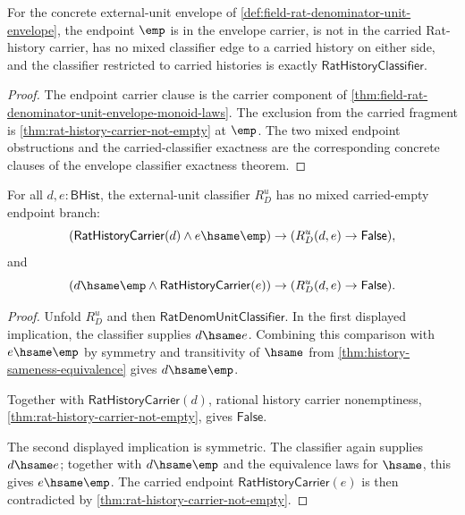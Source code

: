 \begin{theorem}
\label{thm:field-rat-denominator-unit-envelope-external-strict-fragment}
For the concrete external-unit envelope of
\autoref{def:field-rat-denominator-unit-envelope}, the endpoint $\emp$ is in
the envelope carrier, is not in the carried Rat-history carrier, has no mixed
classifier edge to a carried history on either side, and the classifier
restricted to carried histories is exactly $\mathsf{RatHistoryClassifier}$.
\end{theorem}
\begin{proof}
The endpoint carrier clause is the carrier component of
\autoref{thm:field-rat-denominator-unit-envelope-monoid-laws}. The exclusion
from the carried fragment is \autoref{thm:rat-history-carrier-not-empty} at
$\emp$. The two mixed endpoint obstructions and the carried-classifier
exactness are the corresponding concrete clauses of the envelope classifier
exactness theorem.
\end{proof}

\begin{theorem}
\label{thm:field-rat-denominator-unit-envelope-mixed-endpoint-separation}
For all $d,e:\mathsf{BHist}$, the external-unit classifier $R_D^u$ has no
mixed carried-empty endpoint branch:
$$
(\mathsf{RatHistoryCarrier}(d)\land e\hsame\emp)
\to (R_D^u(d,e)\to \mathsf{False}),
$$
and
$$
(d\hsame\emp\land \mathsf{RatHistoryCarrier}(e))
\to (R_D^u(d,e)\to \mathsf{False}).
$$
\end{theorem}
\begin{proof}
Unfold $R_D^u$ and then
$\mathsf{RatDenomUnitClassifier}$. In the first displayed implication, the
classifier supplies $d\hsame e$. Combining this comparison with $e\hsame\emp$
by symmetry and transitivity of $\hsame$ from
\autoref{thm:history-sameness-equivalence} gives $d\hsame\emp$.

Together with $\mathsf{RatHistoryCarrier}(d)$, rational history carrier
nonemptiness, \autoref{thm:rat-history-carrier-not-empty}, gives
$\mathsf{False}$.

The second displayed implication is symmetric. The classifier again supplies
$d\hsame e$; together with $d\hsame\emp$ and the equivalence laws for $\hsame$,
this gives $e\hsame\emp$. The carried endpoint
$\mathsf{RatHistoryCarrier}(e)$ is then contradicted by
\autoref{thm:rat-history-carrier-not-empty}.
\end{proof}

